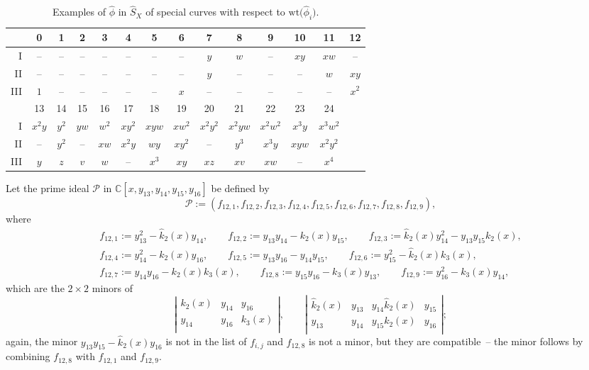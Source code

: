 \documentclass[pdftex]{sigma}
\def\CC{{\mathbb C}}
\def\cP{{\mathcal P}}
\def\hk{{\widehat k}}
\def\hS{{\widehat S}}
\def\hphi{{\widehat \phi}}
\def\wt{{\mathrm {wt}}}
\numberwithin{equation}{section}
\begin{document}
\begin{table}[t]\centering
 \caption{Examples of $\hphi$ in $\hS_X$ of special curves with respect to $\wt\big(\hphi_i\big)$.}\vspace{1mm}
\renewcommand{\arraystretch}{1.3}\small
 \begin{tabular}{|r|ccccccccccccc|}
\hline
 &0&1&2&3&4&5&6&7&8&9&10&11&12\\
\hline
I&--&--&--&--&--&--&--&$y$&$w$&--&$xy$&$xw$&
 --\\
II&--&--&--&--&--&--&--&$y$&--&--&--&$w$&$xy$\\
III&$1$&--&--&--&--&--&$x$&--&--&--&--&--&$x^2$\\
\hline
\hline
&13&14&15&16& 17&18&19&20&21&22&23&24&\\
\hline
I&$x^2y$&$y^2$&$yw$&$w^2$&$xy^2$&$xyw$&$xw^2$&$x^2y^2$&
 $x^2yw$&$x^2w^2$&$x^3y$&$x^3w^2$&\\
II&--&$y^2$&--&$xw$&$x^2y$&$wy$&$xy^2$&--&$y^3$&$x^3y$&$xyw$&$x^2y^2$&\\
III&$y$&$z$&$v$&$w$&--&$x^3$&$xy$&$xz$&$xv$&$xw$&--&$x^4$&\\
\hline
 \end{tabular}
\end{table}

Let the prime ideal $\cP$ in $\CC[x, y_{13}, y_{14}, y_{15}, y_{16}]$ be defined by
\begin{equation*}
 \cP := (f_{12, 1}, f_{12, 2}, f_{12, 3}, f_{12, 4},
f_{12, 5}, f_{12, 6}, f_{12, 7}, f_{12, 8}, f_{12, 9}),
\end{equation*}
where
\begin{gather*}
f_{12,1} := y_{13}^{2} - \hk_{2}(x) y_{14}, \qquad
f_{12,2} := y_{13} y_{14} - k_{2}(x) y_{15}, \qquad
f_{12,3} :=\hk_2(x) y_{14}^{2} - y_{13} y_{15} k_2(x),\! \\
f_{12,4} := y_{14}^{2} - k_{2}(x) y_{16} , \qquad
f_{12,5} :=y_{13}y_{16} - y_{14} y_{15}, \qquad
f_{12,6} := y_{15}^{2} - \hk_2(x)k_3(x), \\
f_{12,7} := y_{14}y_{16} - k_2(x)k_3(x), \qquad
f_{12,8} := y_{15} y_{16} - k_3(x)y_{13}, \qquad
f_{12,9} := y_{16}^{2} - k_3(x)y_{14},
\end{gather*}
which are the $2 \times 2$ minors of
\begin{equation*}
\left|\begin{matrix}
 k_2(x) & y_{14} & y_{16} \\
 y_{14} & y_{16} & k_3(x)\\
\end{matrix} \right|, \qquad
\left|\begin{matrix}
 \hk_2(x) & y_{13} & y_{14} \hk_2(x) & y_{15} \\
 y_{13} & y_{14} & y_{15} k_2(x) & y_{16} \\
\end{matrix} \right|;
\end{equation*}
again, the minor $y_{13} y_{15} - \hk_2(x) y_{16}$ is not in the list of $f_{i,j}$ and $f_{12,8}$ is not a minor, but they are compatible~-- the minor follows by combining $f_{12,8}$ with $f_{12,1}$ and $f_{12,9}$.
\end{document}
